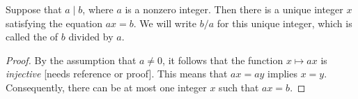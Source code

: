 
\begin{lemma}
  Suppose that $a\mid b$, where $a$ is a nonzero integer. Then there is a unique integer $x$ satisfying the equation $ax=b$. We will write $b/a$ for this unique integer, which is called the  of $b$ divided by $a$.
\end{lemma}

\begin{proof}
%
  By the assumption that $a\neq 0$, it follows that the function $x\mapsto ax$ is \emph{injective} {\color{Red} [needs reference or proof]}. This means that $ax=ay$ implies $x=y$. Consequently, there can be at most one integer $x$ such that $ax=b$.
\end{proof}

